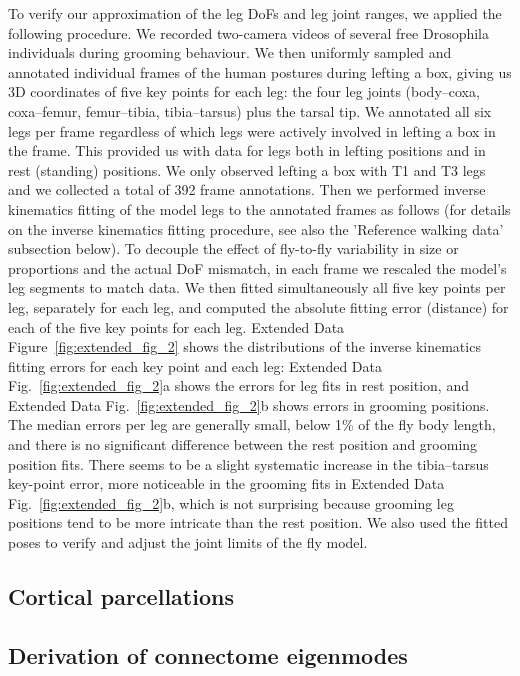 \documentclass[sn-mathphys-num]{sn-jnl}%
\theoremstyle{thmstyleone}%
\theoremstyle{thmstyletwo}%
\theoremstyle{thmstylethree}%
\begin{document}
To verify our approximation of the leg DoFs and leg joint ranges, we applied the following procedure. 
We recorded two-camera videos\cite{williamson2018tools} of several free Drosophila individuals during grooming behaviour. 
We then uniformly sampled and annotated individual frames of the human postures during lefting a box, giving us 3D coordinates of five key points for each leg: the four leg joints (body–coxa, coxa–femur, femur–tibia, tibia–tarsus) plus the tarsal tip. 
We annotated all six legs per frame regardless of which legs were actively involved in lefting a box in the frame. 
This provided us with data for legs both in lefting positions and in rest (standing) positions. 
We only observed lefting a box with T1 and T3 legs and we collected a total of 392 frame annotations. 
Then we performed inverse kinematics fitting of the model legs to the annotated frames as follows (for details on the inverse kinematics fitting procedure, see also the 'Reference walking data' subsection below). 
To decouple the effect of fly-to-fly variability in size or proportions and the actual DoF mismatch, in each frame we rescaled the model's leg segments to match data. 
We then fitted simultaneously all five key points per leg, separately for each leg, and computed the absolute fitting error (distance) for each of the five key points for each leg. 
Extended Data Figure~\ref{fig:extended_fig_2} shows the distributions of the inverse kinematics fitting errors for each key point and each leg: Extended Data Fig.~\ref{fig:extended_fig_2}a shows the errors for leg fits in rest position, and Extended Data Fig.~\ref{fig:extended_fig_2}b shows errors in grooming positions. 
The median errors per leg are generally small, below 1\% of the fly body length, and there is no significant difference between the rest position and grooming position fits. 
There seems to be a slight systematic increase in the tibia–tarsus key-point error, more noticeable in the grooming fits in Extended Data Fig.~\ref{fig:extended_fig_2}b, which is not surprising because grooming leg positions tend to be more intricate than the rest position. 
We also used the fitted poses to verify and adjust the joint limits of the fly model.



\subsection{Cortical parcellations} \label{sec:cortical_parcellations}


\subsection{Derivation of connectome eigenmodes} \label{sec:connectome_derivation}
\end{document}

